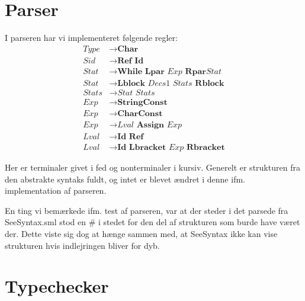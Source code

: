 \documentclass[a4paper, 10pt]{article}
\newcommand{\ra}[0]{\rightarrow}
\begin{document}
\section{Parser}
I parseren har vi implementeret følgende regler:
\begin{align*}
    \textit{Type}  & \ra \textbf{Char} \\
    \textit{Sid}   & \ra \textbf{Ref Id} \\
    \textit{Stat}  & \ra \textbf{While Lpar} \textit{ Exp } \textbf{Rpar}
                         \textit{Stat} \\
    \textit{Stat}  & \ra \textbf{Lblock} \textit{ Decs1 Stats } \textbf{Rblock} \\
    \textit{Stats} & \ra \textit{Stat Stats} \\
    \textit{Exp}   & \ra \textbf{StringConst} \\
    \textit{Exp}   & \ra \textbf{CharConst} \\
    \textit{Exp}   & \ra \textit{Lval} \textbf{ Assign } \textit{Exp} \\
    \textit{Lval}  & \ra \textbf{Id Ref} \\
    \textit{Lval}  & \ra \textbf{Id Lbracket} \textit{ Exp } \textbf{Rbracket}
\end{align*}

Her er terminaler givet i fed og nonterminaler i kursiv. Generelt er strukturen
fra den abstrakte syntaks fuldt, og intet er blevet ændret i denne ifm.
implementation af parseren.


En ting vi bemærkede ifm. test af parseren, var at der steder i det parsede fra
SeeSyntax.sml stod en # i stedet for den del af strukturen som burde have været
der. Dette viste sig dog at hænge sammen med, at SeeSyntax ikke kan vise
strukturen hvis indlejringen bliver for dyb.

\section{Typechecker}


\end{document}
